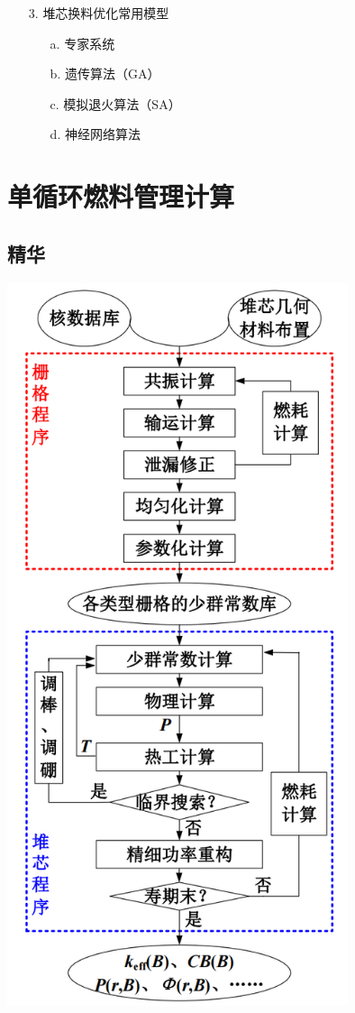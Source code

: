 \documentclass[openany]{ctexart}
\numberwithin{equation}{section} %
\begin{document}
\begin{itemize}
		\vspace{0.06cm}
		
	\item [3.]{\heiti 堆芯换料优化常用模型}
	\vspace{-0.08cm}
	\begin{itemize}
		\item [a.]专家系统
		\item [b.]遗传算法（GA）
		\item [c.]模拟退火算法（SA）
		\item [d.]神经网络算法
	\end{itemize}
\end{itemize}

\section{单循环燃料管理计算}
\subsection{精华}

    {\centering \includegraphics[width=10cm]{resource/5-1.png}}
\end{document}
